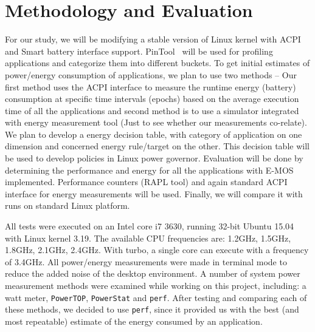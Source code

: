 \section{Methodology and Evaluation}\label{sec:meth}

For our study, we will be modifying a stable version of Linux kernel with ACPI and Smart battery interface support. PinTool~\cite{pin} will be used for profiling applications and categorize them into different buckets. To get initial estimates of power/energy consumption of applications, we plan to use two methods -- Our first method uses the ACPI interface to measure the runtime energy (battery) consumption at specific time intervals (epochs) based on the average execution time of all the applications and second method is to use a simulator integrated with energy measurement tool (Just to see whether our measurements co-relate). 
We plan to develop a energy decision table, with category of application on one dimension and concerned energy rule/target on the other. This decision table will be used to develop policies in Linux power governor.  
Evaluation will be done by determining the performance and energy for all the applications with E-MOS implemented. Performance counters (RAPL tool) and again standard ACPI interface for energy measurements will be used.
Finally, we will compare it with runs on standard Linux platform. 
\fi

All tests were executed on an Intel core i7 3630, running 32-bit Ubuntu 15.04 with Linux kernel 3.19. The available CPU frequencies are: 
1.2GHz, 1.5GHz, 1.8GHz, 2.1GHz, 2.4GHz. With turbo, a single core can execute with a frequency of 3.4GHz. 
All power/energy measurements were made in terminal mode to reduce the added noise of the desktop environment. 
A number of system power measurement methods were examined while working on this project, including: a watt 
meter, \texttt{PowerTOP}, \texttt{PowerStat} and \texttt{perf}. After testing and comparing each of these methods, we decided to use \texttt{perf}, 
since it provided us with the best (and most repeatable) estimate of the energy consumed by an application. 

